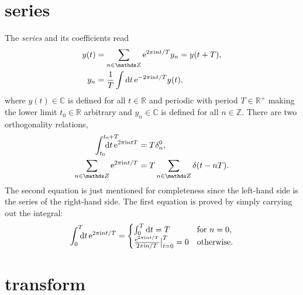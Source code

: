 \section{ series}

The \emph{ series} and its coefficients read
%
\begin{align*}
    y(t) &= \sum_{n \in \mathds Z} \E^{2 \pi \I n t / T} y_n = y(t + T), \\
    y_n &= \frac 1 T \int \D t \, \E^{-2 \pi \I n t / T} y(t),
\end{align*}
%
where $y(t) \in \mathds C$ is defined for all $t \in \mathds R$ and periodic
with period $T \in \mathds R^+$ making the lower limit $t_0 \in \mathds R$
arbitrary and $y_n \in \mathds C$ is defined for all $n \in \mathds Z$. There
are two orthogonality relations,
%
\begin{subequations}
    \begin{align}
        \label{Fourier series orthogonality relation}
        \int \from{t_0} \till{t_0 + T} \D t \, \E^{2 \pi \I n t T}
        &= T \delta_n^0,
        \\
        \label{Dirac comb}
        \sum_{n \in \mathds Z} \E^{2 \pi \I n t / T}
        &= T \sum_{n \in \mathds Z} \delta(t - n T).
    \end{align}
\end{subequations}
%
The second equation is just mentioned for completeness since the left-hand side
is the  series of the right-hand side. The first equation is
proved by simply carrying out the integral:
%
\begin{equation*}
    \int \from 0 \till T \D t \, \E^{2 \pi \I n t / T} =
    \begin{cases}
        \int_0^T \D t = T
            & \text{for $n = 0$,} \\
        \frac{\E^{2 \pi \I n t / T}}{2 \pi \I n / T} \big|_{t = 0}^T = 0
            & \text{otherwise.}
    \end{cases}
\end{equation*}

\section{ transform}

